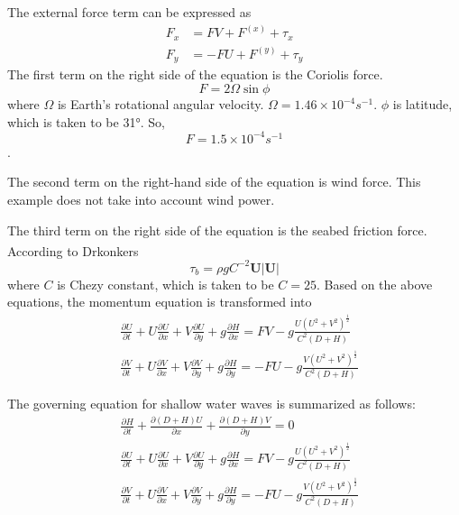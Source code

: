 \documentclass[10pt,a4paper]{article}
\newcommand{\upcite}[1]{\textsuperscript{\zihao{5}\cite{#1}}}
\begin{document}
The external force term can be expressed as
\begin{equation}
	\begin{aligned}
		F_x &= FV + F^{(x)} + \tau_x\\
		F_y &= -FU + F^{(y)} + \tau_y
	\end{aligned}
\end{equation}
The first term on the right side of the equation is the Coriolis force.
\begin{equation}
	F = 2 \Omega \sin\phi
\end{equation}
where $\Omega$ is Earth's rotational angular velocity. $\Omega = 1.46\times10^{-4}s^{-1}$. $\phi$ is latitude, which is taken to be 31°. So, $$F = 1.5\times10^{-4}s^{-1}$$.

The second term on the right-hand side of the equation is wind force. This example does not take into account wind power.

The third term on the right side of the equation is the seabed friction force. According to Drkonkers\upcite{2}
\begin{equation}
	\tau_b = \rho g C^{-2}\boldsymbol{U}|\boldsymbol{U}|
\end{equation}
where $C$ is Chezy constant, which is taken to be $C = 25$.
Based on the above equations, the momentum equation is transformed into
\begin{equation}\label{momentum}
	\begin{aligned}
		&\frac{\partial U}{\partial t} + U\frac{\partial U}{\partial x} + V\frac{\partial U}{\partial y} + g\frac{\partial H}{\partial x} = FV - g\frac{U(U^2 + V^2)^{\frac{1}{2}}}{C^2(D+H)}\\
		&\frac{\partial V}{\partial t} + U\frac{\partial V}{\partial x} + V\frac{\partial V}{\partial y} + g\frac{\partial H}{\partial y} = -FU - g\frac{V(U^2 + V^2)^{\frac{1}{2}}}{C^2(D+H)}
	\end{aligned}
\end{equation}

The governing equation for shallow water waves is summarized as follows:
\begin{equation}\label{control}
	\begin{aligned}
		&\frac{\partial H}{\partial t} + \frac{\partial (D+H)U}{\partial x} + \frac{\partial (D+H)V}{\partial y} = 0\\
		&\frac{\partial U}{\partial t} + U\frac{\partial U}{\partial x} + V\frac{\partial U}{\partial y} + g\frac{\partial H}{\partial x} = FV - g\frac{U(U^2 + V^2)^{\frac{1}{2}}}{C^2(D+H)}\\
		&\frac{\partial V}{\partial t} + U\frac{\partial V}{\partial x} + V\frac{\partial V}{\partial y} + g\frac{\partial H}{\partial y} = -FU - g\frac{V(U^2 + V^2)^{\frac{1}{2}}}{C^2(D+H)}
	\end{aligned}
\end{equation}
\end{document}
